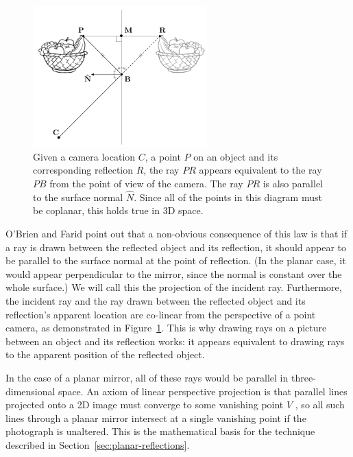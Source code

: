 \documentclass{thesis}
\begin{document}
\begin{figure}
	\centering
    	\includegraphics[width=0.6\textwidth]{normal-reflection}
	\caption{Given a camera location $C$, a point $P$ on an object and its corresponding reflection $R$, the ray $PR$ appears equivalent to the ray $PB$ from the point of view of the camera. The ray $PR$ is also parallel to the surface normal $\hat{N}$. Since all of the points in this diagram must be coplanar, this holds true in 3D space. \cite[Fig.~2]{obrien12}}
	\label{normal-reflection}
\end{figure}

O'Brien and Farid point out that a non-obvious consequence of this law is that if a ray is drawn between the reflected object and its reflection, it should appear to be parallel to the surface normal at the point of reflection. (In the planar case, it would appear perpendicular to the mirror, since the normal is constant over the whole surface.) We will call this the projection of the incident ray. Furthermore, the incident ray and the ray drawn between the reflected object and its reflection's apparent location are co-linear from the perspective of a point camera, as demonstrated in Figure~\ref{normal-reflection}. This is why drawing rays on a picture between an object and its reflection works: it appears equivalent to drawing rays to the apparent position of the reflected object.

In the case of a planar mirror, all of these rays would be parallel in three-dimensional space.\nocite{obrien12} An axiom of linear perspective projection is that parallel lines projected onto a 2D image must converge to some vanishing point $V$ \cite[p.~2]{hartley}, so all such lines through a planar mirror intersect at a single vanishing point if the photograph is unaltered. This is the mathematical basis for the technique described in Section~\ref{sec:planar-reflections}.
\end{document}
